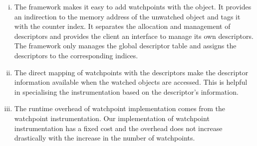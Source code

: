 \begin{enumerate}[i)]
	\item The framework makes it easy to add watchpoints with the object. It provides an indirection to the memory address of the unwatched object and tags it with the counter index. It separates the allocation and management of descriptors and provides the client an interface to manage its own descriptors. The framework only manages the global descriptor table and assigns the descriptors to the corresponding indices. %
	\item The direct mapping of watchpoints with the descriptors make the descriptor information available when the watched objects are accessed. This is helpful in specialising the instrumentation based on the descriptor's information.
	\item The runtime overhead of watchpoint implementation comes from the watchpoint instrumentation. Our implementation of watchpoint instrumentation has a fixed cost and the overhead does not increase drastically with the increase in the number of watchpoints.
\end{enumerate}



